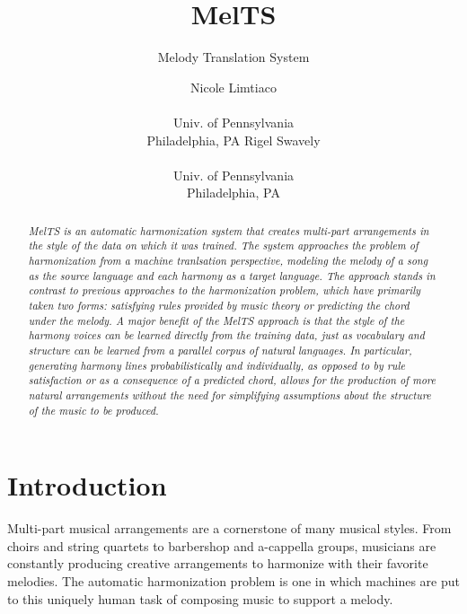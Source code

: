 \documentclass{sig-alternate}
\begin{document}
 

\title{MelTS}
\subtitle{Melody Translation System}
\author{
\alignauthor Nicole Limtiaco \\  \\ Univ. of Pennsylvania \\ Philadelphia, PA
\alignauthor Rigel Swavely \\  \\ Univ. of Pennsylvania \\ Philadelphia, PA}
\date{}
\maketitle

\begin{abstract}
  \textit{MelTS is an automatic harmonization system that creates multi-part arrangements
  in the style of the data on which it was trained. The system approaches the problem
  of harmonization from a machine tranlsation perspective, modeling the melody of a song
  as the source language and each harmony as a target language. The approach stands in
  contrast to previous approaches to the harmonization problem, which have primarily 
  taken two forms: satisfying rules provided by music theory or predicting
  the chord under the melody. A major benefit of the MelTS approach is that
  the style of the harmony voices can be learned directly from the training data, 
  just as vocabulary and structure can be learned from a parallel  corpus of natural languages. In particular, generating harmony lines probabilistically and individually, as opposed to by rule satisfaction or as a consequence of a predicted chord, allows for the production of more natural arrangements without the need for simplifying assumptions about the structure of the music to be produced.}
\end{abstract}

\section{Introduction}
\label{sec:intro}
Multi-part musical arrangements are a cornerstone of many musical styles. From choirs and string quartets to barbershop and a-cappella groups, musicians are constantly producing creative arrangements to harmonize with their favorite melodies. The automatic harmonization problem is one in which machines are put to this uniquely human task of composing music to support a melody. 
\end{document}
